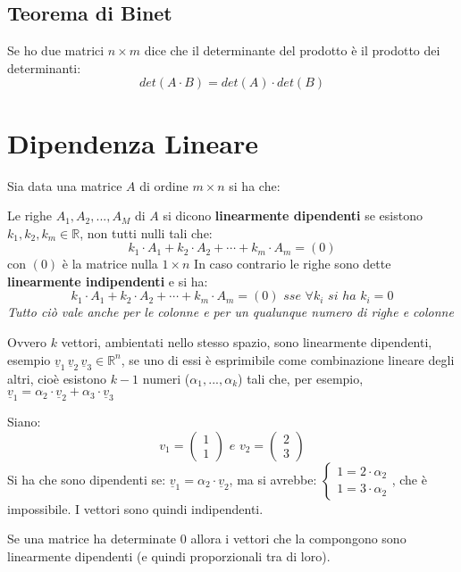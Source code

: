 \documentclass[a4paper,12pt, oneside]{book}
\begin{document}
\subsection{Teorema di Binet}
\begin{teorema}[di Binet]
	Se ho due matrici $n\times m$ dice che il determinante del prodotto è il prodotto dei determinanti:
	$$det(A\cdot B)=det(A)\cdot det(B)$$
\end{teorema}
\section{Dipendenza Lineare}
Sia data una matrice $A$ di ordine $m\times n$ si ha che:
\begin{definizione}
	Le righe $A_1,A_2,...,A_M$ di $A$ si dicono \textbf{linearmente dipendenti} se esistono $k_1,k_2,k_m \in \mathbb{R}$, non tutti nulli tali che:
	$$k_1\cdot A_1+k_2\cdot A_2+\cdots+k_m\cdot A_m=(0)$$
	con $(0)$ è la matrice nulla $1\times n$
	In caso contrario le righe sono dette \textbf{linearmente indipendenti} e si ha:
	$$k_1\cdot A_1+k_2\cdot A_2+\cdots+k_m\cdot A_m=(0)\,\, sse\,\, \forall k_i \,\, si \,\, ha \,\, k_i=0$$
	\textit{Tutto ciò vale anche per le colonne e per un qualunque numero di righe e colonne}
\end{definizione}
Ovvero $k$ vettori, ambientati nello stesso spazio, sono linearmente dipendenti, esempio $\underline{v}_1\, \underline{v}_2\, \underline{v}_3\in \mathbb{R}^{n}$, se uno di essi è esprimibile come combinazione lineare degli altri, cioè esistono $k-1$ numeri ($\alpha_1,...,\alpha_k$) tali che, per esempio, $\underline{v}_1=\alpha_2\cdot \underline{v}_2+\alpha_3\cdot \underline{v}_3$
\begin{esempio}
	Siano:
	$$
		v_1=\left(
		\begin{matrix}
				1 \\
				1
			\end{matrix}
		\right)\,\, e \,\,
		v_2=\left(
		\begin{matrix}
				2 \\
				3
			\end{matrix}
		\right)
	$$
	Si ha che sono dipendenti se:
	$\underline{v}_1=\alpha_2\cdot \underline{v}_2$, ma si avrebbe:
	$\begin{cases}1=2\cdot\alpha_2\\1=3\cdot\alpha_2\end{cases}$, che è impossibile. I vettori sono quindi indipendenti.
\end{esempio}
Se una matrice ha determinate 0 allora i vettori che la compongono sono linearmente dipendenti (e quindi proporzionali tra di loro).
\end{document}
